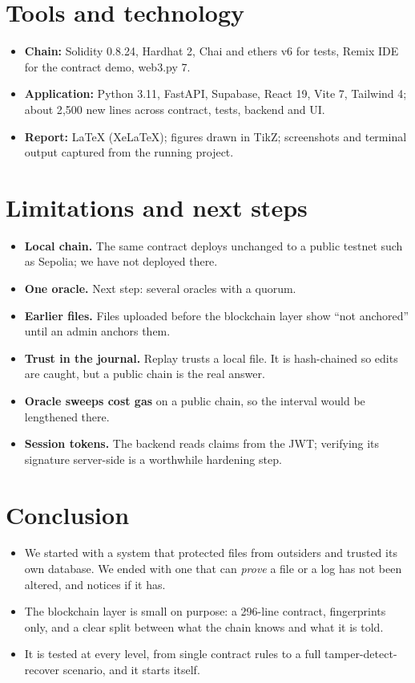 \documentclass[10pt,a4paper]{article}
\begin{document}
\section{Tools and technology}
\begin{itemize}
  \item \textbf{Chain:} Solidity 0.8.24, Hardhat 2, Chai and ethers v6 for tests, Remix IDE for the contract demo, web3.py 7.
  \item \textbf{Application:} Python 3.11, FastAPI, Supabase, React 19, Vite 7, Tailwind 4; about 2{,}500 new lines across contract, tests,
        backend and UI.
  \item \textbf{Report:} LaTeX (XeLaTeX); figures drawn in TikZ; screenshots and terminal output captured from the running project.
\end{itemize}

\section{Limitations and next steps}
\begin{itemize}
  \item \textbf{Local chain.} The same contract deploys unchanged to a public testnet such as Sepolia; we have not deployed there.
  \item \textbf{One oracle.} Next step: several oracles with a quorum.
  \item \textbf{Earlier files.} Files uploaded before the blockchain layer show ``not anchored'' until an admin anchors them.
  \item \textbf{Trust in the journal.} Replay trusts a local file. It is hash-chained so edits are caught, but a public chain is the real answer.
  \item \textbf{Oracle sweeps cost gas} on a public chain, so the interval would be lengthened there.
  \item \textbf{Session tokens.} The backend reads claims from the JWT; verifying its signature server-side is a worthwhile hardening step.
\end{itemize}

\section{Conclusion}
\begin{itemize}
  \item We started with a system that protected files from outsiders and trusted its own database. We ended with one that can
        \emph{prove} a file or a log has not been altered, and notices if it has.
  \item The blockchain layer is small on purpose: a 296-line contract, fingerprints only, and a clear split between what the
        chain knows and what it is told.
  \item It is tested at every level, from single contract rules to a full tamper-detect-recover scenario, and it starts itself.
\end{itemize}
\end{document}
